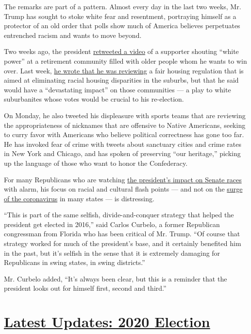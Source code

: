 The remarks are part of a pattern. Almost every day in the last two
weeks, Mr. Trump has sought to stoke white fear and resentment,
portraying himself as a protector of an old order that polls show much
of America believes perpetuates entrenched racism and wants to move
beyond.

Two weeks ago, the president
\href{https://www.nytimes.com/2020/06/28/us/politics/trump-white-power-video-racism.html}{retweeted
a video} of a supporter shouting ``white power'' at a retirement
community filled with older people whom he wants to win over. Last week,
\href{https://www.nytimes.com/2020/07/01/us/politics/trump-obama-housing-discrimination.html}{he
wrote that he was reviewing} a fair housing regulation that is aimed at
eliminating racial housing disparities in the suburbs, but that he said
would have a ``devastating impact'' on those communities --- a play to
white suburbanites whose votes would be crucial to his re-election.

On Monday, he also tweeted his displeasure with sports teams that are
reviewing the appropriateness of nicknames that are offensive to Native
Americans, seeking to curry favor with Americans who believe political
correctness has gone too far. He has invoked fear of crime with tweets
about sanctuary cities and crime rates in New York and Chicago, and has
spoken of preserving ``our heritage,'' picking up the language of those
who want to honor the Confederacy.

For many Republicans who are watching
\href{https://www.nytimes.com/2020/06/25/us/politics/trump-senate-republicans-poll.html}{the
president's impact on Senate races} with alarm, his focus on racial and
cultural flash points --- and not on the
\href{https://www.nytimes.com/2020/07/06/world/coronavirus-updates.html}{surge
of the coronavirus} in many states --- is distressing.

``This is part of the same selfish, divide-and-conquer strategy that
helped the president get elected in 2016,'' said Carlos Curbelo, a
former Republican congressman from Florida who has been critical of Mr.
Trump. ``Of course that strategy worked for much of the president's
base, and it certainly benefited him in the past, but it's selfish in
the sense that it is extremely damaging for Republicans in swing states,
in swing districts.''

Mr. Curbelo added, ``It's always been clear, but this is a reminder that
the president looks out for himself first, second and third.''

\hypertarget{latest-updates-2020-election}{%
\section{\texorpdfstring{\href{https://www.nytimes.com/2020/07/31/us/elections/biden-vs-trump.html?action=click\&pgtype=Article\&state=default\&region=MAIN_CONTENT_1\&context=storylines_live_updates}{Latest
Updates: 2020
Election}}{Latest Updates: 2020 Election}}\label{latest-updates-2020-election}}

